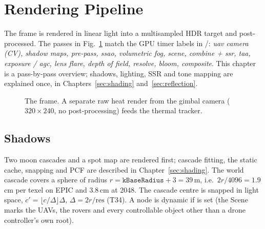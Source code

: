\section{Rendering Pipeline}\label{sec:pipeline}
The frame is rendered in linear light into a multisampled HDR target and post-processed. The passes in
Fig.~\ref{fig:frame} match the GPU timer labels in /: \emph{uav camera (CV), shadow maps, pre-pass, ssao, volumetric fog, scene,
combine + ssr, taa, exposure / agc, lens flare, depth of field, resolve, bloom, composite}. This chapter is a pass-by-pass overview; shadows,
lighting, SSR and tone mapping are explained once, in Chapters~\ref{sec:shading} and~\ref{sec:reflection}.

\begin{figure}[h]
\centering
{}
\caption{The frame. A separate raw heat render from the gimbal camera ($320\times240$, no post-processing) feeds the
thermal tracker.}
\label{fig:frame}
\end{figure}

\subsection{Shadows}
Two moon cascades and a spot map are rendered first; cascade fitting, the static cache, snapping and PCF are described in Chapter~\ref{sec:shading}.
The world cascade covers a sphere of radius $r=\texttt{kBaseRadius}+3=39$\,m, i.e.\ $2r/4096=1.9$\,cm per texel on EPIC and 3.8\,cm at 2048.
The cascade centre is snapped in light space, $c'=\lfloor c/\Delta\rfloor\Delta$, $\Delta=2r/\text{res}$ (T34). A node is dynamic if  is set
(the Scene marks the UAVs, the rovers and every controllable object other than a drone controller's own root).

